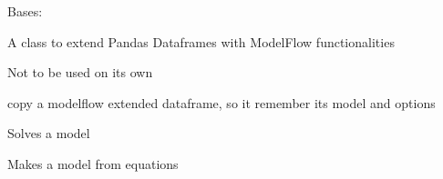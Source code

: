\documentclass[letterpaper,10pt,english]{sphinxmanual}
\begin{document}
\begin{fulllineitems}
\label{\detokenize{used/modelmf:modelmf.mf}}
\pysigstartsignatures
{}
\pysigstopsignatures
\sphinxAtStartPar
Bases: 

\sphinxAtStartPar
A class to extend Pandas Dataframes with ModelFlow functionalities

\sphinxAtStartPar
Not to be used on its own

\begin{fulllineitems}
\label{\detokenize{used/modelmf:modelmf.mf.copy}}
\pysigstartsignatures
{}
\pysigstopsignatures
\sphinxAtStartPar
copy a modelflow extended dataframe, so it remember its model and options

\end{fulllineitems}


\begin{fulllineitems}
\label{\detokenize{used/modelmf:modelmf.mf.solve}}
\pysigstartsignatures
{}
\pysigstopsignatures
\sphinxAtStartPar
Solves a model

\end{fulllineitems}


\begin{fulllineitems}
\label{\detokenize{used/modelmf:modelmf.mf.makemodel}}
\pysigstartsignatures
{}
\pysigstopsignatures
\sphinxAtStartPar
Makes a model from equations

\end{fulllineitems}


\end{fulllineitems}
\end{document}

